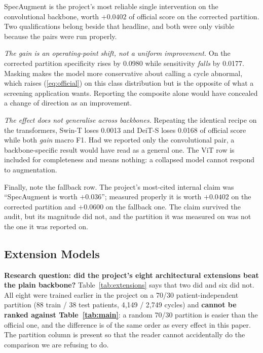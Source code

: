 \documentclass[journal,onecolumn]{IEEEtran}
\begin{document}
SpecAugment is the project's most reliable single intervention on the
convolutional backbone, worth $+0.0402$ of official score on the corrected
partition. Two qualifications belong beside that headline, and both were only
visible because the pairs were run properly.

\emph{The gain is an operating-point shift, not a uniform improvement.} On the
corrected partition specificity rises by 0.0980 while sensitivity \emph{falls} by
0.0177. Masking makes the model more conservative about calling a cycle abnormal,
which raises (\ref{eq:official}) on this class distribution but is the opposite of
what a screening application wants. Reporting the composite alone would have
concealed a change of direction as an improvement.

\emph{The effect does not generalise across backbones.} Repeating the identical
recipe on the transformers, Swin-T loses 0.0013 and DeiT-S loses 0.0168 of
official score while both \emph{gain} macro F1. Had we reported only the
convolutional pair, a backbone-specific result would have read as a general one.
The ViT row is included for completeness and means nothing: a collapsed model
cannot respond to augmentation.

Finally, note the fallback row. The project's most-cited internal claim was
``SpecAugment is worth $+0.036$''; measured properly it is worth $+0.0402$ on the
corrected partition and $+0.0600$ on the fallback one. The claim survived the
audit, but its magnitude did not, and the partition it was measured on was not the
one it was reported on.

\subsection{Extension Models}
\label{subsec:extensions}

\textbf{Research question: did the project's eight architectural extensions beat
the plain backbone?} Table~\ref{tab:extensions} says that two did and six did not.
All eight were trained earlier in the project on a 70/30 patient-independent
partition (88 train / 38 test patients, 4{,}149 / 2{,}749 cycles) and
\textbf{cannot be ranked against Table~\ref{tab:main}}: a random 70/30 partition is
easier than the official one, and the difference is of the same order as every
effect in this paper. The partition column is present so that the reader cannot
accidentally do the comparison we are refusing to do.
\end{document}

